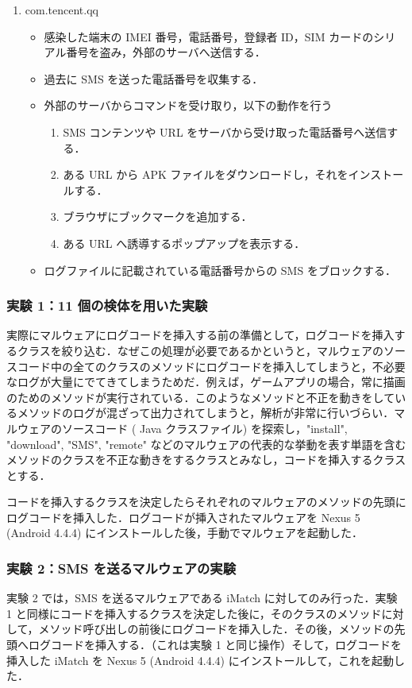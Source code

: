 \begin{enumerate}
\item com.tencent.qq
	\begin{itemize}
	\item 感染した端末の IMEI 番号，電話番号，登録者 ID，SIM カードのシリアル番号を盗み，外部のサーバへ送信する．
	\item 過去に SMS を送った電話番号を収集する．
	\item 外部のサーバからコマンドを受け取り，以下の動作を行う
	\begin{enumerate}
		\item SMS コンテンツや URL をサーバから受け取った電話番号へ送信する．
		\item ある URL から APK ファイルをダウンロードし，それをインストールする．
		\item ブラウザにブックマークを追加する．
		\item ある URL へ誘導するポップアップを表示する．
	\end{enumerate}
	\item ログファイルに記載されている電話番号からの SMS をブロックする．
	\end{itemize}
\end{enumerate}

\subsubsection{実験 1：11 個の検体を用いた実験}
\label{exp1}
実際にマルウェアにログコードを挿入する前の準備として，ログコードを挿入するクラスを絞り込む．なぜこの処理が必要であるかというと，マルウェアのソースコード中の全てのクラスのメソッドにログコードを挿入してしまうと，不必要なログが大量にでてきてしまうためだ．例えば，ゲームアプリの場合，常に描画のためのメソッドが実行されている．このようなメソッドと不正を動きをしているメソッドのログが混ざって出力されてしまうと，解析が非常に行いづらい．マルウェアのソースコード ( Java クラスファイル) を探索し，"install", "download", "SMS", "remote" などのマルウェアの代表的な挙動を表す単語を含むメソッドのクラスを不正な動きをするクラスとみなし，コードを挿入するクラスとする．

コードを挿入するクラスを決定したらそれぞれのマルウェアのメソッドの先頭にログコードを挿入した．ログコードが挿入されたマルウェアを Nexus 5 (Android 4.4.4) にインストールした後，手動でマルウェアを起動した．

\subsubsection{実験 2：SMS  を送るマルウェアの実験}
\label{exp2}
実験 2 では，SMS を送るマルウェアである iMatch に対してのみ行った．実験 1 と同様にコードを挿入するクラスを決定した後に，そのクラスのメソッドに対して，メソッド呼び出しの前後にログコードを挿入した．その後，メソッドの先頭へログコードを挿入する．（これは実験 1 と同じ操作）そして，ログコードを挿入した iMatch を Nexus 5 (Android 4.4.4) にインストールして，これを起動した．

